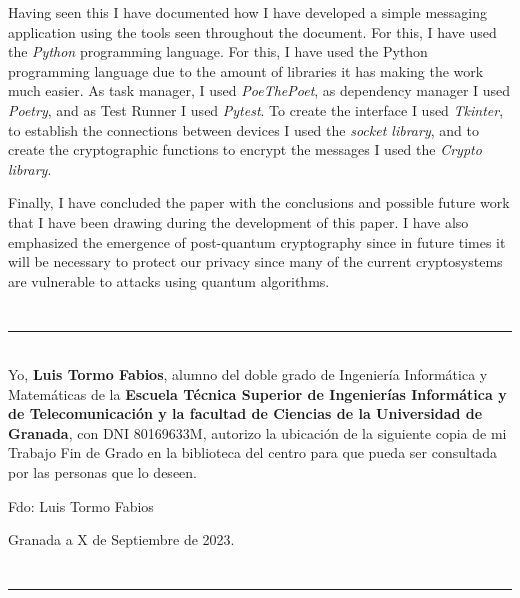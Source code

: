Having seen this I have documented how I have developed a simple messaging application using the tools seen throughout the document. For this, I have used the \emph{Python} programming language. For this, I have used the Python programming language due to the amount of libraries it has making the work much easier. As task manager, I used \emph{PoeThePoet}, as dependency manager I used \emph{Poetry}, and as Test Runner I used \emph{Pytest}.
To create the interface I used \emph{Tkinter}, to establish the connections between devices I used the \emph{socket library}, and to create the cryptographic functions to encrypt the messages I used the \emph{Crypto library}.

Finally, I have concluded the paper with the conclusions and possible future work that I have been drawing during the development of this paper. I have also emphasized the emergence of post-quantum cryptography since in future times it will be necessary to protect our privacy since many of the current cryptosystems are vulnerable to attacks using quantum algorithms.
\chapter*{}
\thispagestyle{empty}

\noindent\rule[-1ex]{\textwidth}{2pt}\\[4.5ex]

Yo, \textbf{Luis Tormo Fabios}, alumno del doble grado de Ingeniería Informática y Matemáticas de la \textbf{Escuela Técnica Superior
de Ingenierías Informática y de Telecomunicación y la facultad de Ciencias de la Universidad de Granada}, con DNI 80169633M, autorizo la
ubicación de la siguiente copia de mi Trabajo Fin de Grado en la biblioteca del centro para que pueda ser
consultada por las personas que lo deseen.

\vspace{6cm}

\noindent Fdo: Luis Tormo Fabios

\vspace{2cm}

\begin{flushright}
Granada a X de Septiembre de 2023.
\end{flushright}


\chapter*{}
\thispagestyle{empty}

\noindent\rule[-1ex]{\textwidth}{2pt}\\[4.5ex]

